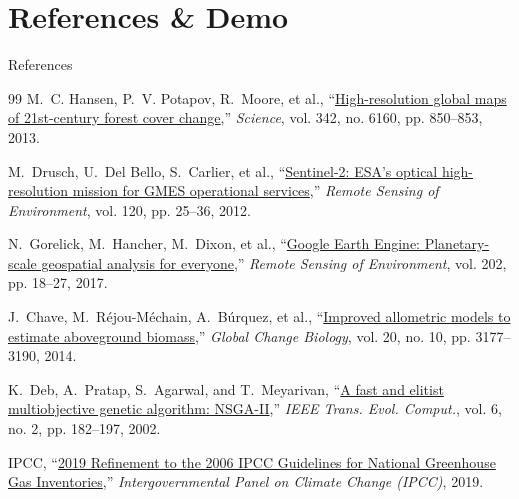 \documentclass[aspectratio=169, 11pt]{beamer}
\begin{document}
\section{References \& Demo}
\begin{frame}[label=references_slide]{References}
    \hypertarget{ref:references_slide}{}
    \fontsize{6.5pt}{8pt}\selectfont
    \begin{thebibliography}{99}
        \setlength{\itemsep}{1.5pt}
        \hypertarget{ref:hansen2013high}{}
        M.~C. Hansen, P.~V. Potapov, R.~Moore, et al., ``\href{https://doi.org/10.1126/science.1244693}{High-resolution global maps of 21st-century forest cover change},'' \textit{Science}, vol. 342, no. 6160, pp. 850--853, 2013.

        \hypertarget{ref:drusch2012sentinel}{}
        M.~Drusch, U.~Del Bello, S.~Carlier, et al., ``\href{https://doi.org/10.1016/j.rse.2011.11.026}{Sentinel-2: ESA's optical high-resolution mission for GMES operational services},'' \textit{Remote Sensing of Environment}, vol. 120, pp. 25--36, 2012.

        \hypertarget{ref:gorelick2017google}{}
        N.~Gorelick, M.~Hancher, M.~Dixon, et al., ``\href{https://doi.org/10.1016/j.rse.2017.06.030}{Google Earth Engine: Planetary-scale geospatial analysis for everyone},'' \textit{Remote Sensing of Environment}, vol. 202, pp. 18--27, 2017.

        \hypertarget{ref:chave2014improved}{}
        J.~Chave, M.~R{\'e}jou-M{\'e}chain, A.~B{\'u}rquez, et al., ``\href{https://doi.org/10.1111/gcb.12629}{Improved allometric models to estimate aboveground biomass},'' \textit{Global Change Biology}, vol. 20, no. 10, pp. 3177--3190, 2014.

        \hypertarget{ref:deb2002fast}{}
        K.~Deb, A.~Pratap, S.~Agarwal, and T.~Meyarivan, ``\href{https://doi.org/10.1109/4235.996017}{A fast and elitist multiobjective genetic algorithm: NSGA-II},'' \textit{IEEE Trans. Evol. Comput.}, vol. 6, no. 2, pp. 182--197, 2002.

        \hypertarget{ref:ipcc2019refinement}{}
        IPCC, ``\href{https://www.ipcc.ch/report/2019-refinement-to-the-2006-ipcc-guidelines-for-national-greenhouse-gas-inventories/}{2019 Refinement to the 2006 IPCC Guidelines for National Greenhouse Gas Inventories},'' \textit{Intergovernmental Panel on Climate Change (IPCC)}, 2019.


\end{thebibliography}
\end{frame}
\end{document}
